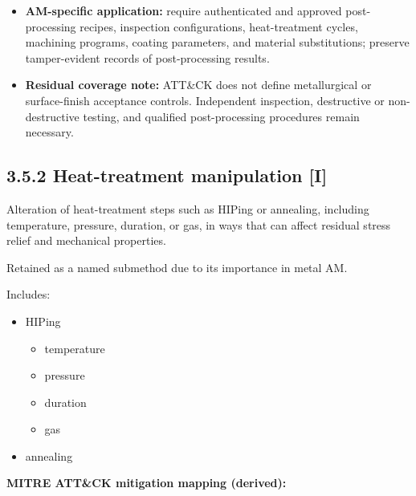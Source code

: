\documentclass[10pt,a4paper,oneside]{report}
\begin{document}
\begin{itemize}
\item \textbf{AM-specific application:} require authenticated and approved post-processing recipes, inspection configurations, heat-treatment cycles, machining programs, coating parameters, and material substitutions; preserve tamper-evident records of post-processing results.
\end{itemize}

\begin{itemize}
\item \textbf{Residual coverage note:} ATT\&CK does not define metallurgical or surface-finish acceptance controls. Independent inspection, destructive or non-destructive testing, and qualified post-processing procedures remain necessary.
\end{itemize}


\subsection{3.5.2 Heat-treatment manipulation [I]}


Alteration of heat-treatment steps such as HIPing or annealing, including temperature, pressure, duration, or gas, in ways that can affect residual stress relief and mechanical properties.

Retained as a named submethod due to its importance in metal AM.

Includes:

\begin{itemize}
\item HIPing
\begin{itemize}
\item temperature
\item pressure
\item duration
\item gas
\end{itemize}
\item annealing
\end{itemize}

\textbf{MITRE ATT\&CK mitigation mapping (derived):}
\end{document}
